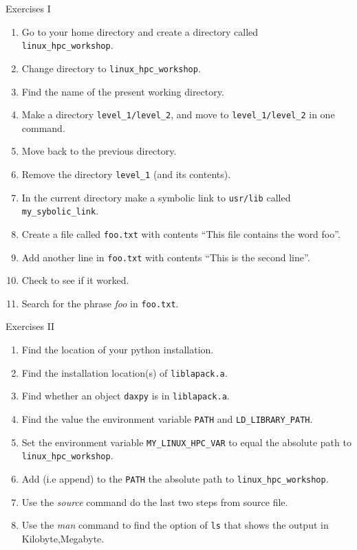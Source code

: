 \documentclass{beamer}
\begin{document}
\begin{frame}{Exercises I}
  \fontsize{8pt}{8}\selectfont
  \begin{enumerate}
    \item Go to your home directory and create a directory called \texttt{linux\_hpc\_workshop}.
    \item Change directory to \texttt{linux\_hpc\_workshop}.
    \item Find the name of the present working directory.
    \item Make a directory \texttt{level\_1/level\_2}, and move to \texttt{level\_1/level\_2} in one command.
    \item Move back to the previous directory.
    \item Remove the directory \texttt{level\_1} (and its contents).
    \item In the current directory make a symbolic link to \texttt{usr/lib} called \texttt{my\_sybolic\_link}.
    \item Create a file called \texttt{foo.txt} with contents ``This file contains the word foo''.
    \item Add another line in \texttt{foo.txt} with contents ``This is the second line''.
    \item Check to see if it worked.
    \item Search for the phrase \emph{foo} in \texttt{foo.txt}.
  \end{enumerate}
\end{frame}


\begin{frame}{Exercises II}
  \fontsize{8pt}{8}\selectfont
  \begin{enumerate}
    \item Find the location of your python installation.
    \item Find the installation location(s) of \texttt{liblapack.a}.
    \item Find whether an object \texttt{daxpy} is in \texttt{liblapack.a}.
    \item Find the value the environment variable \texttt{PATH} and \texttt{LD\_LIBRARY\_PATH}.
    \item Set the environment variable \texttt{MY\_LINUX\_HPC\_VAR} to equal the absolute path to \texttt{linux\_hpc\_workshop}.
    \item Add (i.e append) to the \texttt{PATH} the absolute path to \texttt{linux\_hpc\_workshop}.
    \item Use the \textit{source} command do the last two steps from source file.
    \item Use the \textit{man} command to find the option of \texttt{ls} that shows the output in Kilobyte,Megabyte.
  \end{enumerate}
\end{frame}
\end{document}

